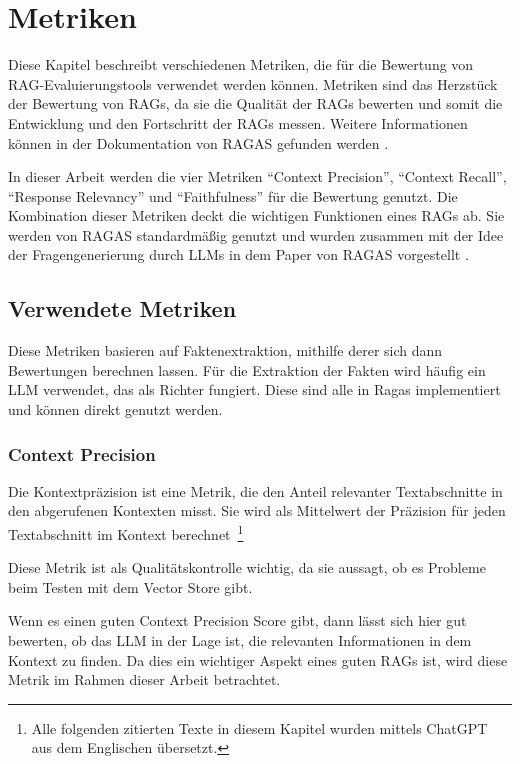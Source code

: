 \section{Metriken}
\label{chap:metrics}
Diese Kapitel beschreibt verschiedenen Metriken, die für die Bewertung von RAG\--Eva\-lu\-ierung\-stools verwendet werden können.
Metriken sind das Herzstück der Bewertung von RAGs, da sie die Qualität der RAGs bewerten und somit die Entwicklung und den Fortschritt der RAGs messen.
Weitere Informationen können in der Dokumentation von RAGAS gefunden werden \cite{ragas_metrics_2025}.

In dieser Arbeit werden die vier Metriken \enquote{Context Precision}, \enquote{Context Recall}, \enquote{Response Relevancy} und \enquote{Faithfulness} für die Bewertung genutzt.
Die Kombination dieser Metriken deckt die wichtigen Funktionen eines RAGs ab. Sie werden von RAGAS standardmäßig genutzt und wurden zusammen mit der Idee der Fragengenerierung durch LLMs in dem Paper von RAGAS vorgestellt \cite{es-etal-2024-ragas}.

\subsection{Verwendete Metriken}
Diese Metriken basieren auf Faktenextraktion, mithilfe derer sich dann Bewertungen berechnen lassen.
Für die Extraktion der Fakten wird häufig ein LLM verwendet, das als Richter fungiert.
Diese sind alle in Ragas implementiert und können direkt genutzt werden.

\subsubsection{Context Precision}
\begin{plainquote}
Die Kontextpräzision ist eine Metrik, die den Anteil relevanter Textabschnitte in den abgerufenen Kontexten misst.
Sie wird als Mittelwert der Präzision für jeden Textabschnitt im Kontext berechnet~\cite{ragas_context_precision}\footnote{Alle folgenden zitierten Texte in diesem Kapitel wurden mittels ChatGPT aus dem Englischen übersetzt.}
\end{plainquote}

Diese Metrik ist als Qualitätskontrolle wichtig, da sie aussagt, ob es Probleme beim Testen mit dem Vector Store gibt.

Wenn es einen guten Context Precision Score gibt, dann lässt sich hier gut bewerten, ob das LLM in der Lage ist, die relevanten Informationen in dem Kontext zu finden.
Da dies ein wichtiger Aspekt eines guten RAGs ist, wird diese Metrik im Rahmen dieser Arbeit betrachtet.

